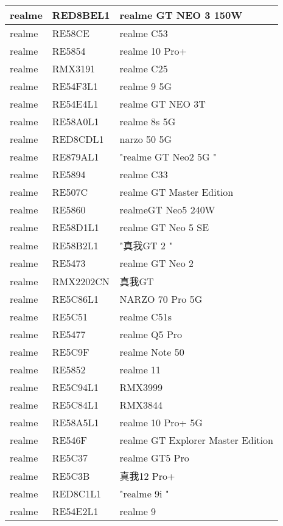 \begin{tabularx}{\linewidth}{|l|X|X|}
        realme & RED8BEL1 & realme GT NEO 3 150W \\ \hline
        realme & RE58CE & realme C53 \\ \hline
        realme & RE5854 & realme 10 Pro+ \\ \hline
        realme & RMX3191 & realme C25 \\ \hline
        realme & RE54F3L1 & realme 9 5G \\ \hline
        realme & RE54E4L1 & realme GT NEO 3T \\ \hline
        realme & RE58A0L1 & realme 8s 5G \\ \hline
        realme & RED8CDL1 & narzo 50 5G \\ \hline
        realme & RE879AL1 & "realme GT Neo2 5G	" \\ \hline
        realme & RE5894 & realme C33 \\ \hline
        realme & RE507C & realme GT Master Edition \\ \hline
        realme & RE5860 & realmeGT Neo5 240W \\ \hline
        realme & RE58D1L1 & realme GT Neo 5 SE \\ \hline
        realme & RE58B2L1 & "真我GT 2	" \\ \hline
        realme & RE5473 & realme GT Neo 2 \\ \hline
        realme & RMX2202CN & 真我GT \\ \hline
        realme & RE5C86L1 & NARZO 70 Pro 5G \\ \hline
        realme & RE5C51 & realme C51s \\ \hline
        realme & RE5477 & realme Q5 Pro \\ \hline
        realme & RE5C9F & realme Note 50 \\ \hline
        realme & RE5852 & realme 11 \\ \hline
        realme & RE5C94L1 & RMX3999 \\ \hline
        realme & RE5C84L1 & RMX3844 \\ \hline
        realme & RE58A5L1 & realme 10 Pro+ 5G \\ \hline
        realme & RE546F & realme GT Explorer Master Edition \\ \hline
        realme & RE5C37 & realme GT5 Pro \\ \hline
        realme & RE5C3B & 真我12 Pro+ \\ \hline
        realme & RED8C1L1 & "realme 9i	" \\ \hline
        realme & RE54E2L1 & realme 9 \\ \hline

\end{tabularx}
